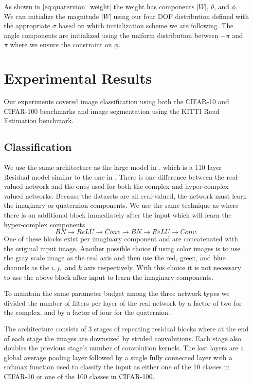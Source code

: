 \documentclass[conference]{IEEEtran}
\begin{document}
As shown in \eqref{eq:quaternion_weight} the weight has components $|W|$, $\theta$, and $\phi$. 
We can initialize the magnitude $|W|$ using our four DOF distribution defined with the appropriate $\sigma$ based on which initialization scheme we are following. 
The angle components are initialized using the uniform distribution between $-\pi$ and $\pi$ where we ensure the constraint on $\phi$.


\section{Experimental Results}
Our experiments covered image classification using both the CIFAR-10 and CIFAR-100 benchmarks and image segmentation using the KITTI Road Estimation benchmark.

\subsection{Classification}
We use the same architecture as the large model in \cite{trabelsi2017deep}, which is a 110 layer Residual model similar to the one in \cite{he2016deep}.
There is one difference between the real-valued network and the ones used for both the complex and hyper-complex valued networks.
Because the datasets are all real-valued, the network must learn the imaginary or quaternion components.
We use the same technique as \cite{trabelsi2017deep} where there is an additional block immediately after the input which will learn the hyper-complex components
\begin{equation*}
BN \rightarrow ReLU \rightarrow Conv \rightarrow BN \rightarrow ReLU \rightarrow Conv.
\end{equation*}
One of these blocks exist per imaginary component and are concatenated with the original input image.
Another possible choice if using color images is to use the gray scale image as the real axis and then use the red, green, and blue channels as the $i, j,$ and $k$ axis respectively.
With this choice it is not necessary to use the above block after input to learn the imaginary components.

To maintain the same parameter budget among the three network types we divided the number of filters per layer of the real network by a factor of two for the complex, and by a factor of four for the quaternion.

The architecture consists of 3 stages of repeating residual blocks where at the end of each stage the images are downsized by strided convolutions.
Each stage also doubles the previous stage's number of convolution kernels.
The last layers are a global average pooling layer followed by a single fully connected layer with a softmax function used to classify the input as either one of the 10 classes in CIFAR-10 or one of the 100 classes in CIFAR-100.
\end{document}
